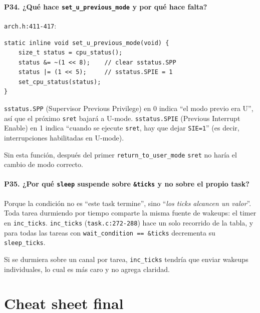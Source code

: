 \documentclass[11pt,a4paper]{article}
\begin{document}
\subsection*{P34. ¿Qué hace \texttt{set\_u\_previous\_mode} y por qué hace falta?}

\begin{respuesta}
\texttt{arch.h:411-417}:

\begin{lstlisting}[style=cstyle]
static inline void set_u_previous_mode(void) {
    size_t status = cpu_status();
    status &= ~(1 << 8);    // clear sstatus.SPP
    status |= (1 << 5);     // sstatus.SPIE = 1
    set_cpu_status(status);
}
\end{lstlisting}

\texttt{sstatus.SPP} (Supervisor Previous Privilege) en 0 indica
``el modo previo era U'', así que el próximo \texttt{sret} bajará a
U-mode. \texttt{sstatus.SPIE} (Previous Interrupt Enable) en 1
indica ``cuando se ejecute \texttt{sret}, hay que dejar
\texttt{SIE=1}'' (es decir, interrupciones habilitadas en U-mode).

Sin esta función, después del primer \texttt{return\_to\_user\_mode}
\texttt{sret} no haría el cambio de modo correcto.
\end{respuesta}

\subsection*{P35. ¿Por qué \texttt{sleep} suspende sobre \texttt{\&ticks} y no sobre el propio task?}

\begin{respuesta}
Porque la condición no es ``este task termine'', sino ``\emph{los
ticks alcancen un valor}''. Toda tarea durmiendo por tiempo
comparte la misma fuente de wakeups: el timer en \texttt{inc\_ticks}.
\texttt{inc\_ticks} (\texttt{task.c:272-288}) hace un solo recorrido
de la tabla, y para todas las tareas con
\texttt{wait\_condition == \&ticks} decrementa su
\texttt{sleep\_ticks}.

Si se durmiera sobre un canal por tarea, \texttt{inc\_ticks}
tendría que enviar wakeups individuales, lo cual es más caro y no
agrega claridad.
\end{respuesta}

\part{Cheat sheet final}
\end{document}
